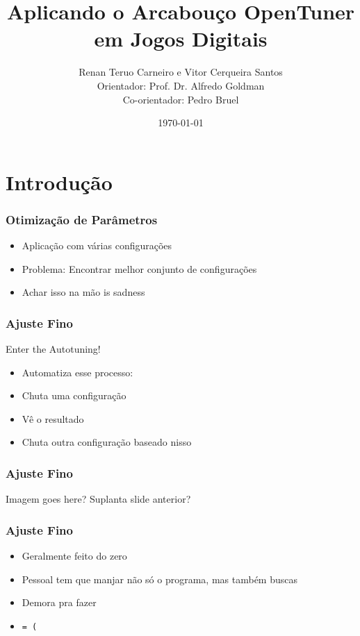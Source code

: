 \documentclass[10pt]{beamer}
\title{Aplicando o Arcabouço OpenTuner em Jogos Digitais}
\date{\today}
\author{Renan Teruo Carneiro e Vitor Cerqueira Santos\\
	Orientador: Prof. Dr. Alfredo Goldman\\
    Co-orientador: Pedro Bruel}
\institute{Instituto de Matemática e Estatística}
\begin{document}
\maketitle


\section{Introdução}

\begin{frame}[fragile]
	\frametitle{Otimização de Parâmetros}
	  \begin{itemize}[<+- | alert@+>]
	  	\item Aplicação com várias configurações
	  	\item Problema: Encontrar melhor conjunto de configurações
	  	\item Achar isso na mão is sadness
	  \end{itemize}
\end{frame}

\begin{frame}[fragile]
  \frametitle{Ajuste Fino}
	  Enter the Autotuning!
	  \pause
	  \begin{itemize}[<+- | alert@+>]
	  	\item Automatiza esse processo:
	  	\item   Chuta uma configuração
	  	\item   Vê o resultado
	  	\item   Chuta outra configuração baseado nisso
	  \end{itemize} 
  
\end{frame}

\begin{frame}[fragile]
	\frametitle{Ajuste Fino}
	Imagem goes here? Suplanta slide anterior?
\end{frame}

\begin{frame}[fragile]
	\frametitle{Ajuste Fino}
	  \begin{itemize}[<+- | alert@+>]
	  	\item Geralmente feito do zero
	  	\item Pessoal tem que manjar não só o programa, mas também buscas
	  	\item Demora pra fazer
	  	\item \begin{verbatim}= (\end{verbatim}
	\end{itemize}
\end{frame}
\end{document}
